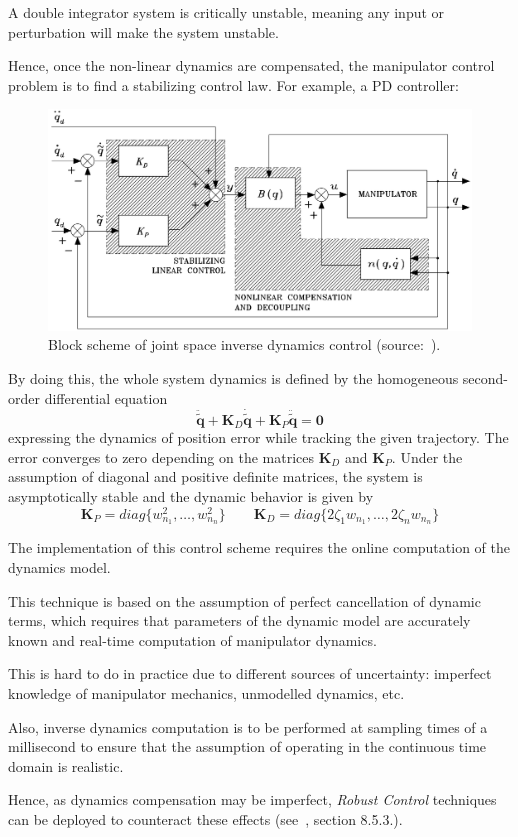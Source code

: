 \documentclass[10pt, aspectratio=169]{beamer}
\theoremstyle{remark}
\theoremstyle{definition}
\begin{document}
\begin{frame}[allowframebreaks]
    A double integrator system is critically unstable, meaning any input or perturbation will make the system unstable. 

    \framebreak

    Hence, once the non-linear dynamics are compensated, the manipulator control problem is to find a stabilizing control law. For example, a PD controller:

    \begin{figure}
        \centering
        \includegraphics[width=0.7\linewidth]{images/joint_space_inverse_dynamics_control.png}
        \caption{Block scheme of joint space inverse dynamics control (source:~\cite{sciavicco2010robotics}).}
        \label{fig:joint_space_inverse_dynamics_control}
    \end{figure}

    \framebreak
    
    By doing this, the whole system dynamics is defined by the homogeneous second-order differential equation
    $$
    \ddot{\tilde{\mathbf{q}}} +  \mathbf{K}_D \dot{\tilde{\mathbf{q}}}  +  \mathbf{K}_P \ddot{\tilde{\mathbf{q}}}  = \boldsymbol{0}
    $$
    expressing the dynamics of position error while tracking the given trajectory. The error converges to zero depending on the matrices $\mathbf{K}_D$ and $\mathbf{K}_P$. Under the assumption of diagonal and positive definite matrices, the system is asymptotically stable and the dynamic behavior is given by 
    $$
    \mathbf{K}_P = diag\{w_{n_1}^2, \dots, w_{n_n}^2 \} \quad \quad \mathbf{K}_D = diag\{2 \zeta_1 w_{n_1}, \dots, 2 \zeta_n w_{n_n} \}
    $$

    \framebreak

    The implementation of this control scheme requires the online computation of the dynamics model.

    This technique is based on the assumption of perfect cancellation of dynamic terms, which requires that parameters of the dynamic model are accurately known and real-time computation of manipulator dynamics.
    
    This is hard to do in practice due to different sources of uncertainty: imperfect knowledge of manipulator mechanics, unmodelled dynamics, etc.  

    Also, inverse dynamics computation is to be performed at sampling times of a millisecond to ensure that the assumption of operating in the continuous time domain is realistic. 

    Hence, as dynamics compensation may be imperfect, \textit{Robust Control} techniques can be deployed to counteract these effects (see~\cite{sciavicco2010robotics}, section 8.5.3.). 

    
\end{frame}
\end{document}
